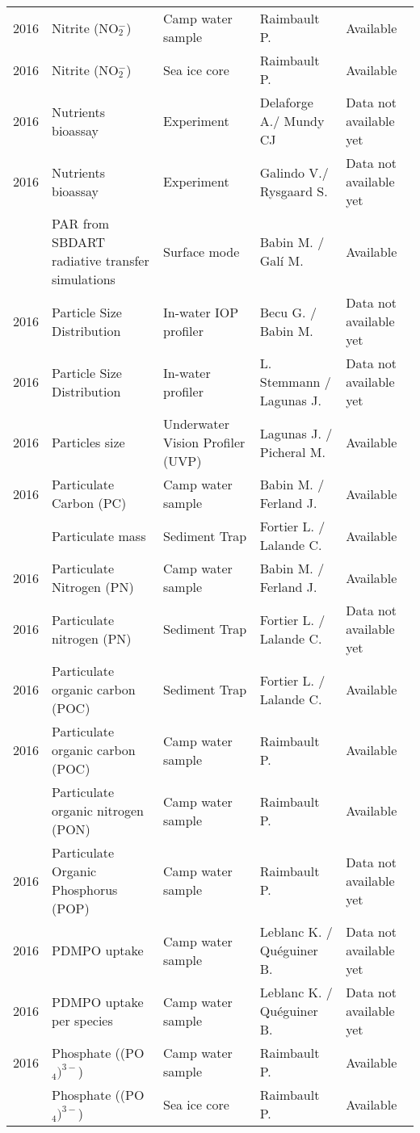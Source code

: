 \documentclass[]{article}
\begin{document}
\begin{landscape}
\begin{longtable}[t]{rllll}
2016 & Nitrite (NO$^-_2$) & Camp water sample & Raimbault P. & Available\\
2016 & Nitrite (NO$^-_2$) & Sea ice core & Raimbault P. & Available\\
2016 & Nutrients bioassay & Experiment & Delaforge A./ Mundy CJ & Data not available yet\\
2016 & Nutrients bioassay & Experiment & Galindo V./ Rysgaard S. & Data not available yet\\
\addlinespace
2016 & PAR from SBDART radiative transfer simulations & Surface mode & Babin M. / Galí M. & Available\\
2016 & Particle Size Distribution & In-water IOP profiler & Becu G. / Babin M. & Data not available yet\\
2016 & Particle Size Distribution & In-water profiler & L. Stemmann / Lagunas J. & Data not available yet\\
2016 & Particles size & Underwater Vision Profiler (UVP) & Lagunas J. / Picheral M. & Available\\
2016 & Particulate Carbon (PC) & Camp water sample & Babin M. / Ferland J. & Available\\
\addlinespace
2016 & Particulate mass & Sediment Trap & Fortier L. / Lalande C. & Available\\
2016 & Particulate Nitrogen (PN) & Camp water sample & Babin M. / Ferland J. & Available\\
2016 & Particulate nitrogen (PN) & Sediment Trap & Fortier L. / Lalande C. & Data not available yet\\
2016 & Particulate organic carbon (POC) & Sediment Trap & Fortier L. / Lalande C. & Available\\
2016 & Particulate organic carbon (POC) & Camp water sample & Raimbault P. & Available\\
\addlinespace
2016 & Particulate organic nitrogen (PON) & Camp water sample & Raimbault P. & Available\\
2016 & Particulate Organic Phosphorus (POP) & Camp water sample & Raimbault P. & Data not available yet\\
2016 & PDMPO uptake & Camp water sample & Leblanc K. / Quéguiner B. & Data not available yet\\
2016 & PDMPO uptake per species & Camp water sample & Leblanc K. / Quéguiner B. & Data not available yet\\
2016 & Phosphate ((PO$_4)^{3-}$) & Camp water sample & Raimbault P. & Available\\
\addlinespace
2016 & Phosphate ((PO$_4)^{3-}$) & Sea ice core & Raimbault P. & Available\\

\end{longtable}
\end{landscape}
\end{document}
